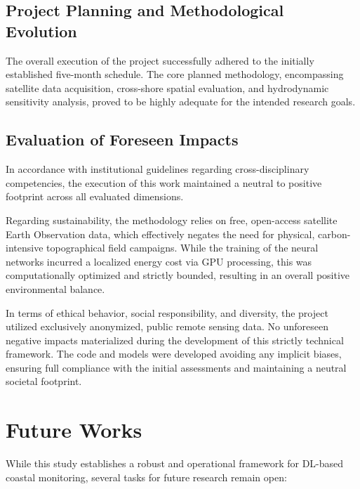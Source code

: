﻿\documentclass[ENG]{TFUOC}%
\begin{document}
\subsection{Project Planning and Methodological Evolution}
The overall execution of the project successfully adhered to the initially established five-month schedule. The core planned methodology, encompassing satellite data acquisition, cross-shore spatial evaluation, and hydrodynamic sensitivity analysis, proved to be highly adequate for the intended research goals.

\subsection{Evaluation of Foreseen Impacts}
In accordance with institutional guidelines regarding cross-disciplinary competencies, the execution of this work maintained a neutral to positive footprint across all evaluated dimensions. 

Regarding sustainability, the methodology relies on free, open-access satellite Earth Observation data, which effectively negates the need for physical, carbon-intensive topographical field campaigns. While the training of the neural networks incurred a localized energy cost via GPU processing, this was computationally optimized and strictly bounded, resulting in an overall positive environmental balance. 

In terms of ethical behavior, social responsibility, and diversity, the project utilized exclusively anonymized, public remote sensing data. No unforeseen negative impacts materialized during the development of this strictly technical framework. The code and models were developed avoiding any implicit biases, ensuring full compliance with the initial assessments and maintaining a neutral societal footprint.

\section{Future Works}
While this study establishes a robust and operational framework for DL-based coastal monitoring, several tasks for future research remain open:
\end{document}
